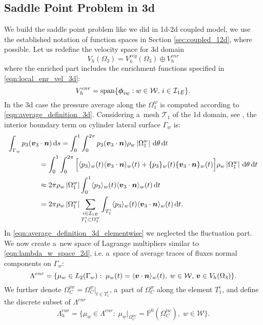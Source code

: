\subsection{Saddle Point Problem in 3d}
We build the saddle point problem like we did in 1d-2d coupled model,
we use the established notation of function spaces in Section \ref{sec:coupled_12d}, where possible.
Let us redefine the velocity space for 3d domain
\begin{equation}
    V_h(\Omega_3) = V^{reg}_{h}(\Omega_3) \oplus V^{enr}_h
\end{equation}
where the enriched part includes the enrichment functions specified in \eqref{eqn:local_enr_vel_3d}:
\begin{equation}
    V^{enr}_h = \textrm{span}\{\mathbf{\boldsymbol{\phi}}_{iw}: w\in\mathcal{W},\, i\in\mathcal{I}_{1E}\}.
\end{equation}
%
In the 3d case the pressure average along the $\Omega^w_1$ is computed according to \eqref{eqn:average_definition_3d}.
Considering a~mesh $\mathcal{T}_1$ of the 1d domain, see ,
the interior boundary term on cylinder lateral surface $\Gamma_w$ is:
\begin{align} \label{eqn:average_definition_3d_elementwise}
    \int_{\Gamma_w} p_3(\mathbf{\boldsymbol{v}}_3 &\cdot \mathbf{\boldsymbol{n}})\,{\rm d} s =\int_0^1 \int_0^{2\pi} p_3 (\mathbf{\boldsymbol{v}}_3\cdot \mathbf{\boldsymbol{n}}) \rho_w\left|\Omega^w_1\right| \,{\rm d} \theta \,{\rm d} t \nonumber\\
     &= \int_0^1 \int_0^{2\pi} \Big[ \langle p_3\rangle_w(t) \langle\mathbf{\boldsymbol{v}}_3\cdot \mathbf{\boldsymbol{n}}\rangle_w(t) +
        \{p_3\}_w(t) \{\mathbf{\boldsymbol{v}}_3\cdot \mathbf{\boldsymbol{n}}\}_w(t) \Big]  \rho_w\left|\Omega^w_1\right| \,{\rm d} \theta \,{\rm d} t \nonumber\\
    &\approx 2\pi\rho_w\left|\Omega^w_1\right| \int_0^1 \langle p_3\rangle_ w(t) \langle\mathbf{\boldsymbol{v}}_3\cdot \mathbf{\boldsymbol{n}}\rangle_w(t) \,{\rm d} t \nonumber\\
    &= 2\pi\rho_w\left|\Omega^w_1\right| \sum_{\substack{i\in\mathcal{I}_{1E} \\ T^i_1\subset\Omega^w_1}}
        \int_{T^i_1} \langle p_3\rangle_w(t) \langle\mathbf{\boldsymbol{v}}_3\cdot \mathbf{\boldsymbol{n}}\rangle_w(t) \,{\rm d} t.
\end{align}
%
In \eqref{eqn:average_definition_3d_elementwise} we neglected the fluctuation part.
We now create a~new space of Lagrange multipliers similar to \eqref{eqn:lambda_w_space_2d},
i.e. a~space of average traces of fluxes normal components on $\Gamma_w$:
\begin{equation}
    \Lambda^{enr} = \{\mu_w\in L_2(\Gamma_w):\;
    \mu_w(t)=\langle\mathbf{\boldsymbol{v}}\cdot \mathbf{\boldsymbol{n}}\rangle_w(t),\; w\in\mathcal{W},\, \mathbf{\boldsymbol{v}}\in V_h(\Omega_3)\}.
\end{equation}
We further denote $\Omega^{iw}_C = \Omega^w_C|_{t\in T^i_1}$, a~part of $\Omega^w_C$ along the element $T^i_1$,
and define the discrete subset of $\Lambda^{enr}$
\begin{equation}
    \Lambda^{enr}_h = \{\mu_w\in \Lambda^{enr}:\;
    \mu_w|_{\Omega^{iw}_C}=\mathbb P^0(\Omega^{iw}_C),\; w\in\mathcal{W}\}.
\end{equation}

